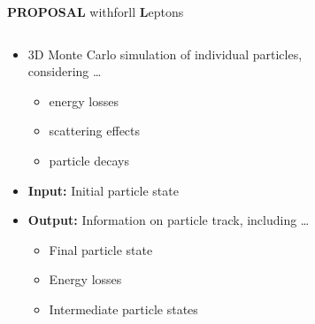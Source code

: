 \begin{frame}{}
  \vspace{-3cm}
  \begin{minipage}[t][1cm][t]{\textwidth}
  {\huge \textbf{PROPOSAL}} {\huge\textbf{\rightarrow}}
  \colorbox{tugreen}{}{\Large with}\colorbox{tugreen}{}{\Large for}\colorbox{tugreen}{ll {\huge \textbf{L}}{\Large eptons}}
  \end{minipage}
  \begin{minipage}[t][1cm][t]{\textwidth}
  \vspace{-5mm}
    \begin{columns}[onlytextwidth]
        \begin{column}{0.5\textwidth}
            \begin{itemize}
              \item 3D Monte Carlo simulation of individual particles, considering \ldots
              \begin{itemize}
                \item[\normalcolor{\ldots}] energy losses
                \item[\normalcolor{\ldots}] scattering effects
                \item[\normalcolor{\ldots}] particle decays
              \end{itemize}
              \item \textbf{Input:} Initial particle state
              \item \textbf{Output:} Information on particle track, including \ldots
              \begin{itemize}
                \item[\normalcolor{\ldots}] Final particle state
                \item[\normalcolor{\ldots}] Energy losses
                \item[\normalcolor{\ldots}] Intermediate particle states
              \end{itemize}
            \end{itemize}
        \end{column}
        \begin{column}{0.5\textwidth}
            \begin{figure}

\end{figure}
\end{column}
\end{columns}
\end{minipage}
\end{frame}
